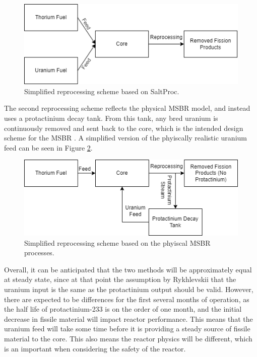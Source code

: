 \begin{figure}[H]
  \centering
  \includegraphics[scale=0.7]{images/sp-match-repr-scheme.png}
  \caption{Simplified reprocessing scheme based on SaltProc.}
   \label{fig:spmatchrepr}
\end{figure}

The second reprocessing scheme reflects the physical MSBR model, and instead uses a protactinium decay tank. From this tank, any bred uranium is continuously removed and sent back to the core, which is the intended design scheme for the MSBR \cite{robertson_conceptual_1971}. A simplified version of the phyiscally realistic uranium feed can be seen in Figure \ref{fig:nonspmatchrepr}.

\begin{figure}[H]
  \centering
  \includegraphics[scale=0.7]{images/phys-repr-scheme.png}
  \caption{Simplified reprocessing scheme based on the phyiscal MSBR processes.}
   \label{fig:nonspmatchrepr}
\end{figure}

Overall, it can be anticipated that the two methods will be approximately equal at steady state, since at that point the assumption by Rykhlevskii that the uranium input is the same as the protactinium output should be valid. However, there are expected to be differences for the first several months of operation, as the half life of protactinium-233 is on the order of one month, and the initial decrease in fissile material will impact reactor performance. This means that the uranium feed will take some time before it is providing a steady source of fissile material to the core. This also means the reactor physics will be different, which is an important when considering the safety of the reactor.







